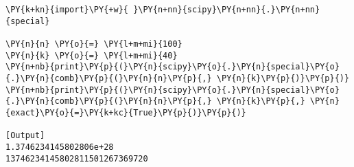 \begin{Verbatim}[label=\makebox{\href{https://github.com/unipi-physics-labs/lab1-notes/tree/main/snippy/scipy.special.comb.py}{https://github.com/.../scipy.special.comb.py}},commandchars=\\\{\}]
\PY{k+kn}{import}\PY{+w}{ }\PY{n+nn}{scipy}\PY{n+nn}{.}\PY{n+nn}{special}

\PY{n}{n} \PY{o}{=} \PY{l+m+mi}{100}
\PY{n}{k} \PY{o}{=} \PY{l+m+mi}{40}
\PY{n+nb}{print}\PY{p}{(}\PY{n}{scipy}\PY{o}{.}\PY{n}{special}\PY{o}{.}\PY{n}{comb}\PY{p}{(}\PY{n}{n}\PY{p}{,} \PY{n}{k}\PY{p}{)}\PY{p}{)}
\PY{n+nb}{print}\PY{p}{(}\PY{n}{scipy}\PY{o}{.}\PY{n}{special}\PY{o}{.}\PY{n}{comb}\PY{p}{(}\PY{n}{n}\PY{p}{,} \PY{n}{k}\PY{p}{,} \PY{n}{exact}\PY{o}{=}\PY{k+kc}{True}\PY{p}{)}\PY{p}{)}

[Output]
1.3746234145802806e+28
13746234145802811501267369720
\end{Verbatim}
